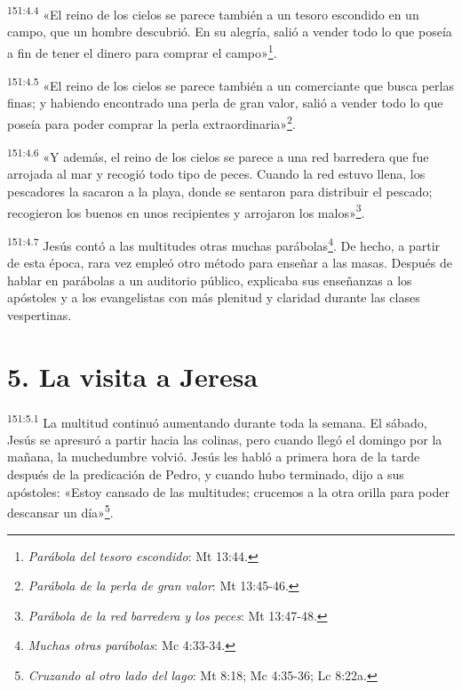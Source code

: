\par
\textsuperscript{151:4.4} «El reino de los cielos se parece también a un tesoro escondido en un campo, que un hombre descubrió. En su alegría, salió a vender todo lo que poseía a fin de tener el dinero para comprar el campo»\footnote{\textit{Parábola del tesoro escondido}: Mt 13:44.}.

\par
\textsuperscript{151:4.5} «El reino de los cielos se parece también a un comerciante que busca perlas finas; y habiendo encontrado una perla de gran valor, salió a vender todo lo que poseía para poder comprar la perla extraordinaria»\footnote{\textit{Parábola de la perla de gran valor}: Mt 13:45-46.}.

\par
\textsuperscript{151:4.6} «Y además, el reino de los cielos se parece a una red barredera que fue arrojada al mar y recogió todo tipo de peces. Cuando la red estuvo llena, los pescadores la sacaron a la playa, donde se sentaron para distribuir el pescado; recogieron los buenos en unos recipientes y arrojaron los malos»\footnote{\textit{Parábola de la red barredera y los peces}: Mt 13:47-48.}.

\par
\textsuperscript{151:4.7} Jesús contó a las multitudes otras muchas parábolas\footnote{\textit{Muchas otras parábolas}: Mc 4:33-34.}. De hecho, a partir de esta época, rara vez empleó otro método para enseñar a las masas. Después de hablar en parábolas a un auditorio público, explicaba sus enseñanzas a los apóstoles y a los evangelistas con más plenitud y claridad durante las clases vespertinas.

\section*{5. La visita a Jeresa}
\par
\textsuperscript{151:5.1} La multitud continuó aumentando durante toda la semana. El sábado, Jesús se apresuró a partir hacia las colinas, pero cuando llegó el domingo por la mañana, la muchedumbre volvió. Jesús les habló a primera hora de la tarde después de la predicación de Pedro, y cuando hubo terminado, dijo a sus apóstoles: «Estoy cansado de las multitudes; crucemos a la otra orilla para poder descansar un día»\footnote{\textit{Cruzando al otro lado del lago}: Mt 8:18; Mc 4:35-36; Lc 8:22a.}.

